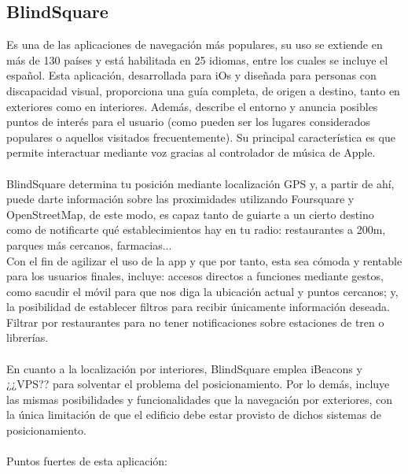\documentclass{article}
\begin{document}
	\subsection{BlindSquare}
	Es una de las aplicaciones de navegación más populares, su uso se extiende en más de 130 países y está habilitada en 25 idiomas, entre los cuales se incluye el español. Esta aplicación, desarrollada para iOs y diseñada para personas con discapacidad visual, proporciona una guía completa, de origen a destino, tanto en exteriores como en interiores. Además, describe el entorno y anuncia posibles puntos de interés para el usuario (como pueden ser los lugares considerados populares o aquellos visitados frecuentemente). Su principal característica es que permite interactuar mediante voz gracias al controlador de música de Apple. 
	\\
	\\
	BlindSquare determina tu posición mediante localización GPS y, a partir de ahí, puede darte información sobre las proximidades utilizando Foursquare y OpenStreetMap, de este modo, es capaz tanto de guiarte a un cierto destino como de notificarte qué establecimientos hay en tu radio: restaurantes a 200m, parques más cercanos, farmacias...
	\\
    Con el fin de agilizar el uso de la app y que por tanto, esta sea cómoda y rentable para los usuarios finales, incluye: accesos directos a funciones mediante gestos, como sacudir el móvil para que nos diga la ubicación actual y puntos cercanos; y, la posibilidad de establecer filtros para recibir únicamente información deseada. Filtrar por restaurantes para no tener notificaciones sobre estaciones de tren o librerías.
	\\
	\\
	En cuanto a la localización por interiores, BlindSquare emplea iBeacons y ¿¿VPS?? para solventar el problema del posicionamiento. Por lo demás, incluye las mismas posibilidades y funcionalidades que la navegación por exteriores, con la única limitación de que el edificio debe estar provisto de dichos sistemas de posicionamiento.
	\\
	\\
	Puntos fuertes de esta aplicación:
\end{document}
